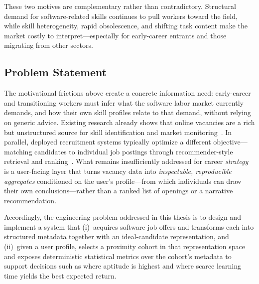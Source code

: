 These two motives are complementary rather than contradictory.
Structural demand for software-related skills continues to pull workers toward the field, while skill heterogeneity, rapid obsolescence, and shifting task content make the market costly to interpret---especially for early-career entrants and those migrating from other sectors.

\subsection{Problem Statement}
\label{sec:problem-statement}

The motivational frictions above create a concrete information need: early-career and transitioning workers must infer what the software labor market currently demands, and how their own skill profiles relate to that demand, without relying on generic advice.
Existing research already shows that online vacancies are a rich but unstructured source for skill identification and market monitoring~\cite{Khaouja2021}.
In parallel, deployed recruitment systems typically optimize a different objective---matching candidates to individual job postings through recommender-style retrieval and ranking~\cite{Zhao2021,Alsaif2022}.
What remains insufficiently addressed for career \emph{strategy} is a user-facing layer that turns vacancy data into \emph{inspectable, reproducible aggregates} conditioned on the user's profile---from which individuals can draw their own conclusions---rather than a ranked list of openings or a narrative recommendation.

Accordingly, the engineering problem addressed in this thesis is to design and implement a system that (i)~acquires software job offers and transforms each into structured metadata together with an ideal-candidate representation, and (ii)~given a user profile, selects a proximity cohort in that representation space and exposes deterministic statistical metrics over the cohort's metadata to support decisions such as where aptitude is highest and where scarce learning time yields the best expected return.


